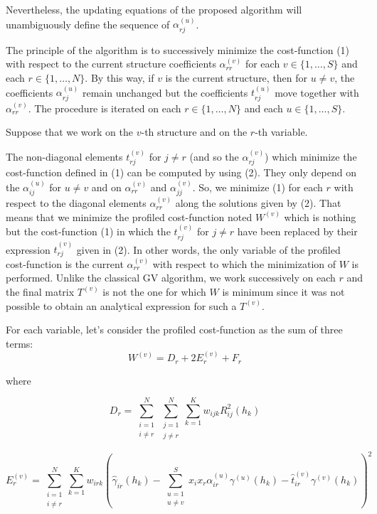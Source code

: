 \documentclass[11pt]{article}
\begin{document}
Nevertheless, the updating equations of the proposed algorithm will unambiguously define the sequence of $\alpha_{rj}^{(u)}$.

The principle of the algorithm is to successively minimize the cost-function (1) with respect to the current structure coefficients $\alpha_{rr}^{(v)}$ for each $v \in \{1,\ldots,S\}$ and each $r \in \{1,\ldots,N\}$. By this way, if $v$ is the current structure, then for $u \ne v$, the coefficients $\alpha_{rj}^{(u)}$ remain unchanged but the coefficients $t_{rj}^{(u)}$ move together with $\alpha_{rr}^{(v)}$. The procedure is iterated on each $r \in \{1,\ldots,N\}$ and each $u \in \{1,\ldots,S\}$.

Suppose that we work on the $v$-th structure and on the $r$-th variable.

The non-diagonal elements $t_{rj}^{(v)}$ for $j \ne r$ (and so the $\alpha_{rj}^{(v)}$) which minimize the cost-function defined in (1) can be computed by using (2). They only depend on the $\alpha_{ij}^{(u)}$ for $u \ne v$ and on $\alpha_{rr}^{(v)}$ and $\alpha_{jj}^{(v)}$. So, we minimize (1) for each $r$ with respect to the diagonal elements $\alpha_{rr}^{(v)}$ along the solutions given by (2). That means that we minimize the profiled cost-function noted $W^{(v)}$ which is nothing but the cost-function (1) in which the $t_{rj}^{(v)}$ for $j \ne r$ have been replaced by their expression $\hat{t}_{rj}^{(v)}$ given in (2). In other words, the only variable of the profiled cost-function is the current $\alpha_{rr}^{(v)}$ with respect to which the minimization of $W$ is performed. Unlike the classical GV algorithm, we work successively on each $r$ and the final matrix $T^{(v)}$ is not the one for which $W$ is minimum since it was not possible to obtain an analytical expression for such a $T^{(v)}$.

For each variable, let’s consider the profiled cost-function as the sum of three terms:
\[
W^{(v)} = D_r + 2E_r^{(v)} + F_r
\]

where

\[
D_r = \sum_{\substack{i=1\\i \ne r}}^N \sum_{\substack{j=1\\j \ne r}}^N \sum_{k=1}^K w_{ijk} R_{ij}^2(h_k)
\]

\[
E_r^{(v)} = \sum_{\substack{i=1\\i \ne r}}^N \sum_{k=1}^K w_{irk} \left( \hat{\gamma}_{ir}(h_k) - \sum_{\substack{u=1\\u \ne v}}^S x_i x_r \alpha_{ir}^{(u)} \gamma^{(u)}(h_k) - \hat{t}_{ir}^{(v)} \gamma^{(v)}(h_k) \right)^2
\]
\end{document}

